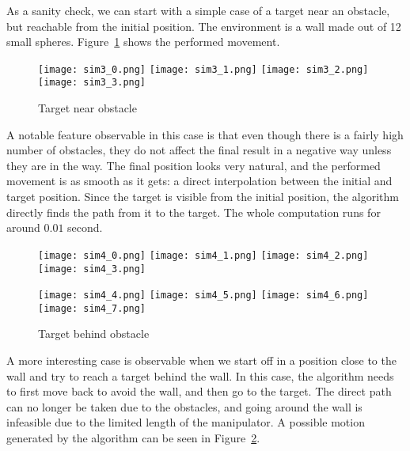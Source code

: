 As a sanity check, we can start with a simple case of a target near an obstacle, but reachable from the initial position. The environment is a wall made out of 12 small spheres. Figure~\ref{fig:sim3} shows the performed movement.

\begin{figure}
  \centering
  \begin{minipage}{\textwidth}
    \texttt{[image: sim3\_0.png]}
    \texttt{[image: sim3\_1.png]}
    \texttt{[image: sim3\_2.png]}
    \texttt{[image: sim3\_3.png]}
  \end{minipage}
  \caption{Target near obstacle}\label{fig:sim3}
\end{figure}

A notable feature observable in this case is that even though there is a fairly high number of obstacles, they do not affect the final result in a negative way unless they are in the way. The final position looks very natural, and the performed movement is as smooth as it gets: a direct interpolation between the initial and target position. Since the target is visible from the initial position, the algorithm directly finds the path from it to the target. The whole computation runs for around $0.01$ second.

\begin{figure}[ht]
  \centering
  \begin{minipage}{0.9\textwidth}
    \texttt{[image: sim4\_0.png]}
    \texttt{[image: sim4\_1.png]}
    \texttt{[image: sim4\_2.png]}
    \texttt{[image: sim4\_3.png]}

    \texttt{[image: sim4\_4.png]}
    \texttt{[image: sim4\_5.png]}
    \texttt{[image: sim4\_6.png]}
    \texttt{[image: sim4\_7.png]}
  \end{minipage}
  \caption{Target behind obstacle}\label{fig:sim4}
\end{figure}

A more interesting case is observable when we start off in a position close to the wall and try to reach a target behind the wall. In this case, the algorithm needs to first move back to avoid the wall, and then go to the target. The direct path can no longer be taken due to the obstacles, and going around the wall is infeasible due to the limited length of the manipulator. A possible motion generated by the algorithm can be seen in Figure~\ref{fig:sim4}.

